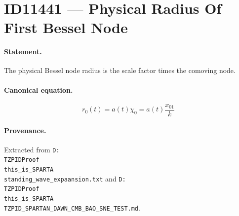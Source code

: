 \section*{ID11441 --- Physical Radius Of First Bessel Node}

\paragraph{Statement.}
The physical Bessel node radius is the scale factor times the comoving node.

\paragraph{Canonical equation.}
\[
r_0(t)=a(t)\chi_0=a(t)\frac{x_{01}}{k}
\]

\paragraph{Provenance.}
Extracted from \texttt{D:\\TZPIDProof\\this\_is\_SPARTA\\standing\_wave\_expaansion.txt} and \texttt{D:\\TZPIDProof\\this\_is\_SPARTA\\TZPID\_SPARTAN\_DAWN\_CMB\_BAO\_SNE\_TEST.md}.
